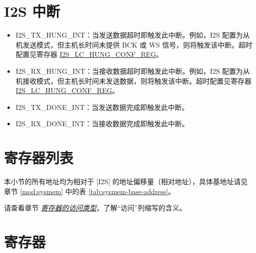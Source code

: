 \documentclass[main\_\_CN.tex]{subfiles}
\begin{document}
\section{I2S 中断} \label{I2S_INT}

\begin{itemize}
\item \label{int:I2STXHUNGINT}I2S\_TX\_HUNG\_INT：当发送数据超时即触发此中断。例如，I2S 配置为从机发送模式，但主机长时间未提供 BCK 或 WS 信号，则将触发该中断。超时配置见寄存器 \hyperref[regdesc:I2SLCHUNGCONFREG]{I2S\_LC\_HUNG\_CONF\_REG}。
\item \label{int:I2SRXHUNGINT}I2S\_RX\_HUNG\_INT：当接收数据超时即触发此中断。例如，I2S 配置为从机接收模式，但主机长时间未发送数据，则将触发该中断。超时配置见寄存器 \hyperref[regdesc:I2SLCHUNGCONFREG]{I2S\_LC\_HUNG\_CONF\_REG}。
\item \label{int:I2STXDONEINT}I2S\_TX\_DONE\_INT：当发送数据完成即触发此中断。
\item \label{int:I2SRXDONEINT}I2S\_RX\_DONE\_INT：当接收数据完成即触发此中断。
\end{itemize}

\hypertarget{i2s-reg-summ}{}
\section{寄存器列表}


本小节的所有地址均为相对于 [I2S] 的地址偏移量（相对地址），具体基地址请见章节 \ref{mod:sysmem} \textit{} 中的表 \ref{tab:sysmem-base-address}。

请查看章节 \hyperref[glossary-access-types]{\textit{寄存器的访问类型}}，了解“访问”列缩写的含义。





\section{寄存器}\label{I2SRegister}


\end{document}
